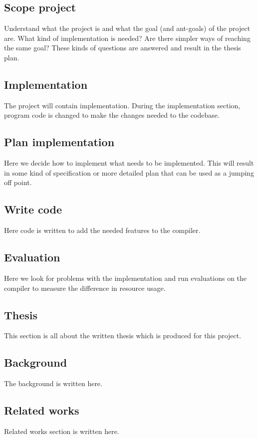 \documentclass[msc,lith,english]{liuthesis}
\begin{document}
\subsection{Scope project}
Understand what the project is and what the goal (and ant-goals) of the project are. What kind of implementation is needed? Are there simpler ways of reaching the same goal? These kinds of questions are answered and result in the thesis plan.

\subsection{Implementation}
The project will contain implementation. During the implementation section, program code is changed to make the changes needed to the codebase.

\subsection{Plan implementation}
Here we decide how to implement what needs to be implemented. This will result in some kind of specification or more detailed plan that can be used as a jumping off point.

\subsection{Write code}
Here code is written to add the needed features to the compiler.

\subsection{Evaluation}
Here we look for problems with the implementation and run evaluations on the compiler to measure the difference in resource usage. 

\subsection{Thesis}
This section is all about the written thesis which is produced for this project.

\subsection{Background}
The background is written here.

\subsection{Related works}
Related works section is written here.
\end{document}
